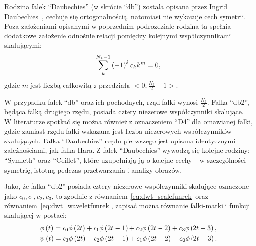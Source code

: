 Rodzina falek \enquote{Daubechies} (w skrócie \enquote{db}) została opisana przez Ingrid Daubechies~\cite{vonesch_dbbasics}, cechuje się ortogonalnością, natomiast nie wykazuje cech symetrii. Poza założeniami opisanymi w poprzednim podrozdziale rodzina ta spełnia dodatkowe założenie odnośnie relacji pomiędzy kolejnymi współczynnikami skalującymi:
\begin{equation}
\sum _{k} ^{N_k-1} \left(-1\right)^{k} c_{k} k^{m} = 0 \label{eq:db_musthave},
\end{equation}
gdzie $m$ jest liczbą całkowitą z przedziału $<0;\frac{N_{k}}{2}-1>$.

W przypadku falek \enquote{db} oraz ich pochodnych, rząd falki wynosi $\frac{N_{k}}{2}$. Falka \enquote{db2}, będąca falką drugiego rzędu, posiada cztery niezerowe współczynniki skalujące. W literaturze spotkać się można również z oznaczeniem \enquote{D4} dla omawianej falki, gdzie zamiast rzędu falki wskazana jest liczba niezerowych współczynników skalujących. Falka \enquote{Daubechies} rzędu pierwszego jest opisana identycznymi zależnościami, jak falka Hara. Z falek \enquote{Daubechies} wywodzą się kolejne rodziny: \enquote{Symleth} oraz \enquote{Coiflet}, które uzupełniają ją o kolejne cechy -- w szczególności symetrię, istotną podczas przetwarzania i analizy obrazów.

Jako, że falka \enquote{db2} posiada cztery niezerowe współczynniki skalujące oznaczone jako $c_0, c_1, c_2, c_3$, to zgodnie z równaniem~\eqref{eq:dwt_scalefunrek} oraz równaniem~\eqref{eq:dwt_waveletfunrek}, zapisać można równanie falki-matki i funkcji skalującej w postaci:
\begin{gather}
\phi \left(t\right) = c_{0} \phi \left(2t\right) + c_{1} \phi \left( 2t - 1 \right) + c_{2} \phi \left( 2t - 2 \right) + c_{3} \phi \left( 2t - 3 \right) \label{eq:db2_scalefunrek}, \\
\psi \left(t\right) = c_{3} \phi \left(2t\right) - c_{2} \phi \left( 2t - 1 \right) + c_{1} \phi \left( 2t - 2 \right) - c_{0} \phi \left( 2t - 3 \right) \label{eq:db2_waveletfunrek}.
\end{gather}

